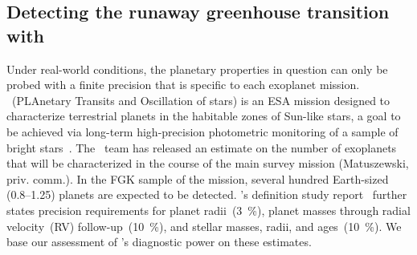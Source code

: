 \documentclass[modern]{aastex631}
\begin{document}
\subsection{Detecting the runaway greenhouse transition with \plato}\label{sec:res_samplesize}
Under real-world conditions, the planetary properties in question can only be probed with a finite precision that is specific to each exoplanet mission.
\plato\ (PLAnetary Transits and Oscillation of stars) is an ESA mission designed to characterize terrestrial planets in the habitable zones of Sun-like stars, a goal to be achieved via long-term high-precision photometric monitoring of a sample of bright stars~\citep{Rauer2016}.
The \plato\ team has released an estimate on the number of exoplanets that will be characterized in the course of the main survey mission (Matuszewski, priv. comm.).
In the FGK sample of the mission, several hundred Earth-sized (\SIrange{0.8}{1.25}{\rEarth}) planets are expected to be detected.
\plato's definition study report~\citep{plato2017} further states precision requirements for planet radii~(\SI{3}{\percent}), planet masses through radial velocity~(RV) follow-up~(\SI{10}{\percent}), and stellar masses, radii, and ages~(\SI{10}{\percent}).
We base our assessment of \plato's diagnostic power on these estimates.
\end{document}
